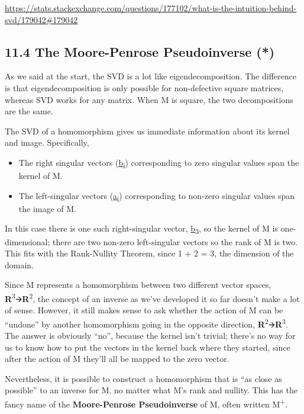 \documentclass[oneside,english]{amsbook}
\numberwithin{section}{chapter}
\theoremstyle{plain}
\theoremstyle{definition}
\begin{document}
\url{https://stats.stackexchange.com/questions/177102/what-is-the-intuition-behind-svd/179042\#179042}

\subsection{11.4 The Moore-Penrose Pseudoinverse
	(*)}\label{the-moore-penrose-pseudoinverse}

As we said at the start, the SVD is a lot like eigendecomposition. The
difference is that eigendecomposition is only possible for non-defective
square matrices, whereas SVD works for any matrix. When M is square, the
two decompositions are the same.

The SVD of a homomorphism gives us immediate information about its
kernel and image. Specifically,

\begin{itemize}
	\item
	The right singular vectors (\ul{b}\textsubscript{i}) corresponding to
	zero singular values span the kernel of M.
	\item
	The left-singular vectors (\ul{a}\textsubscript{i}) corresponding to
	non-zero singular values span the image of M.
\end{itemize}

In this case there is one such right-singular vector,
\ul{b}\textsubscript{3}, so the kernel of M is one-dimensional; there
are two non-zero left-singular vectors so the rank of M is two. This
fits with the Rank-Nullity Theorem, since 1 + 2 = 3, the dimension of
the domain.

Since M represents a homomorphism between two different vector spaces,
\textbf{R}\textsuperscript{3}🡪\textbf{R}\textsuperscript{2}, the concept
of an inverse as we've developed it so far doesn't make a lot of sense.
However, it still makes sense to ask whether the action of M can be
``undone'' by another homomorphism going in the opposite direction,
\textbf{R}\textsuperscript{2}🡪\textbf{R}\textsuperscript{3}. The answer
is obviously ``no'', because the kernel isn't trivial; there's no way
for us to know how to put the vectors in the kernel back where they
started, since after the action of M they'll all be mapped to the zero
vector.

Nevertheless, it is possible to construct a homomorphism that is ``as
close as possible'' to an inverse for M, no matter what M's rank and
nullity. This has the fancy name of the \textbf{Moore-Penrose
	Pseudoinverse} of M, often written M\textsuperscript{+}.
\end{document}
